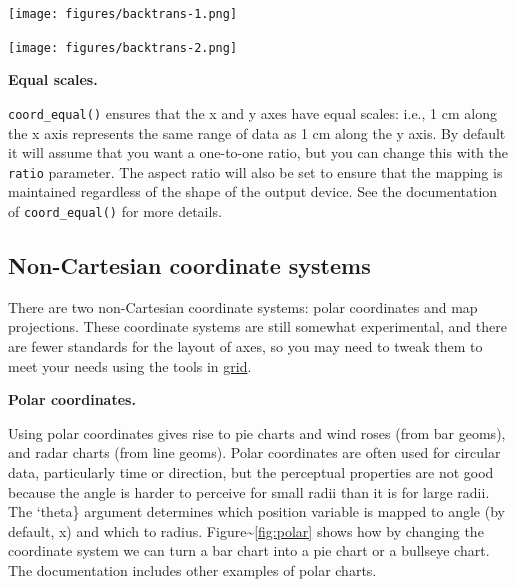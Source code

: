 \begin{Shaded}
\begin{Highlighting}[]
\StringTok{ }\NormalTok{(}\NormalTok{)}
  \NormalTok{) +}\StringTok{ }
\StringTok{  }\NormalTok{(} \NormalTok{)}
\end{Highlighting}
\end{Shaded}

\texttt{[image: figures/backtrans-1.png]}

\begin{Shaded}
\begin{Highlighting}[]
\NormalTok{() +}\StringTok{ }\NormalTok{(}  
\end{Highlighting}
\end{Shaded}

\texttt{[image: figures/backtrans-2.png]}

\textbf{Equal scales.}

\texttt{coord\_equal()} ensures that the x and y axes have equal scales:
i.e., 1 cm along the x axis represents the same range of data as 1 cm
along the y axis. By default it will assume that you want a one-to-one
ratio, but you can change this with the \texttt{ratio} parameter. The
aspect ratio will also be set to ensure that the mapping is maintained
regardless of the shape of the output device. See the documentation of
\texttt{coord\_equal()} for more details. 
 

\subsection{Non-Cartesian coordinate systems}

There are two non-Cartesian coordinate systems: polar coordinates and
map projections. These coordinate systems are still somewhat
experimental, and there are fewer standards for the layout of axes, so
you may need to tweak them to meet your needs using the tools in
\hyperref[cha:grid]{grid}. 

\textbf{Polar coordinates.}

Using polar coordinates gives rise to pie charts and wind roses (from
bar geoms), and radar charts (from line geoms). Polar coordinates are
often used for circular data, particularly time or direction, but the
perceptual properties are not good because the angle is harder to
perceive for small radii than it is for large radii. The `theta\}
argument determines which position variable is mapped to angle (by
default, x) and which to radius. Figure\textasciitilde{}\ref{fig:polar}
shows how by changing the coordinate system we can turn a bar chart into
a pie chart or a bullseye chart. The documentation includes other
examples of polar charts. 
 

